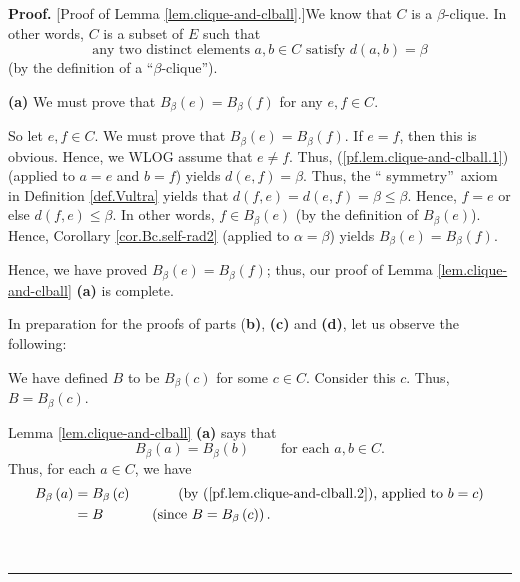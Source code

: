 \documentclass[numbers=enddot,12pt,final,onecolumn,notitlepage]{scrartcl}%
\theoremstyle{definition}
\newenvironment{proof}[1][Proof]{\noindent\textbf{#1.} }{\ \rule{0.5em}{0.5em}}
\renewcommand{\leq}{\leqslant}
\theoremstyle{plainsl}
\begin{document}
\begin{proof}
[Proof of Lemma \ref{lem.clique-and-clball}.]We know that $C$ is a $\beta
$-clique. In other words, $C$ is a subset of $E$ such that%
\begin{equation}
\text{any two distinct elements }a,b\in C\text{ satisfy }d\left(  a,b\right)
=\beta\label{pf.lem.clique-and-clball.1}%
\end{equation}
(by the definition of a \textquotedblleft$\beta$-clique\textquotedblright).
\medskip

\textbf{(a)} We must prove that $B_{\beta}\left(  e\right)  =B_{\beta}\left(
f\right)  $ for any $e,f\in C$.

So let $e,f\in C$. We must prove that $B_{\beta}\left(  e\right)  =B_{\beta
}\left(  f\right)  $. If $e=f$, then this is obvious. Hence, we WLOG assume
that $e\neq f$. Thus, (\ref{pf.lem.clique-and-clball.1}) (applied to $a=e$ and
$b=f$) yields $d\left(  e,f\right)  =\beta$. Thus, the \textquotedblleft
symmetry\textquotedblright\ axiom in Definition \ref{def.Vultra} yields that
$d\left(  f,e\right)  =d\left(  e,f\right)  =\beta\leq\beta$. Hence, $f=e$ or
else $d\left(  f,e\right)  \leq\beta$. In other words, $f\in B_{\beta}\left(
e\right)  $ (by the definition of $B_{\beta}\left(  e\right)  $). Hence,
Corollary \ref{cor.Bc.self-rad2} (applied to $\alpha=\beta$) yields $B_{\beta
}\left(  e\right)  =B_{\beta}\left(  f\right)  $.

Hence, we have proved $B_{\beta}\left(  e\right)  =B_{\beta}\left(  f\right)
$; thus, our proof of Lemma \ref{lem.clique-and-clball} \textbf{(a)} is
complete. \medskip

In preparation for the proofs of parts (\textbf{b)}, \textbf{(c)} and
\textbf{(d)}, let us observe the following:

We have defined $B$ to be $B_{\beta}\left(  c\right)  $ for some $c\in C$.
Consider this $c$. Thus, $B=B_{\beta}\left(  c\right)  $.

Lemma \ref{lem.clique-and-clball} \textbf{(a)} says that
\begin{equation}
B_{\beta}\left(  a\right)  =B_{\beta}\left(  b\right)
\ \ \ \ \ \ \ \ \ \ \text{for each }a,b\in C.
\label{pf.lem.clique-and-clball.2}%
\end{equation}
Thus, for each $a\in C$, we have
\begin{align}
B_{\beta}\left(  a\right)   &  =B_{\beta}\left(  c\right)
\ \ \ \ \ \ \ \ \ \ \left(  \text{by (\ref{pf.lem.clique-and-clball.2}),
applied to }b=c\right) \nonumber\\
&  =B\ \ \ \ \ \ \ \ \ \ \left(  \text{since }B=B_{\beta}\left(  c\right)
\right)  . \label{pf.lem.clique-and-clball.3}%
\end{align}



\end{proof}
\end{document}
